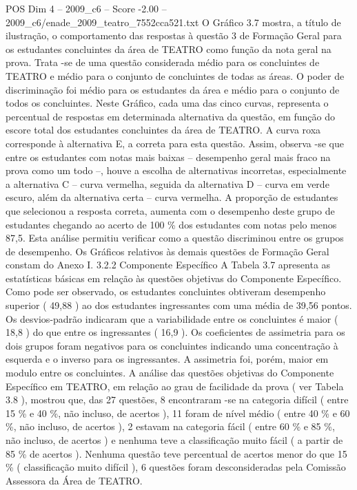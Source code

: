 \begin{textsample}{POS Dim 4 – 2009\_c6 – Score -2.00 – 2009\_c6/enade\_2009\_teatro\_7552cca521.txt}
O Gráfico 3.7 mostra, a título de ilustração, o comportamento das respostas à questão 3 de Formação Geral para os estudantes concluintes da área de TEATRO como função da nota geral na prova.
Trata -se de uma questão considerada médio para os concluintes de TEATRO e médio para o conjunto de concluintes de todas as áreas.
O poder de discriminação foi médio para os estudantes da área e médio para o conjunto de todos os concluintes.
Neste Gráfico, cada uma das cinco curvas, representa o percentual de respostas em determinada alternativa da questão, em função do escore total dos estudantes concluintes da área de TEATRO.
A curva roxa corresponde à alternativa E, a correta para esta questão.
Assim, observa -se que entre os estudantes com notas mais baixas – desempenho geral mais fraco na prova como um todo –, houve a escolha de alternativas incorretas, especialmente a alternativa C – curva vermelha, seguida da alternativa D – curva em verde escuro, além da alternativa certa – curva vermelha.
A proporção de estudantes que selecionou a resposta correta, aumenta com o desempenho deste grupo de estudantes chegando ao acerto de 100 \% dos estudantes com notas pelo menos 87,5.
Esta análise permitiu verificar como a questão discriminou entre os grupos de desempenho.
Os Gráficos relativos às demais questões de Formação Geral constam do Anexo I. 3.2.2 Componente Específico A Tabela 3.7 apresenta as estatísticas básicas em relação às questões objetivas do Componente Específico.
Como pode ser observado, os estudantes concluintes obtiveram desempenho superior ( 49,88 ) ao dos estudantes ingressantes com uma média de 39,56 pontos.
Os desvios-padrão indicaram que a variabilidade entre os concluintes é maior ( 18,8 ) do que entre os ingressantes ( 16,9 ).
Os coeficientes de assimetria para os dois grupos foram negativos para os concluintes indicando uma concentração à esquerda e o inverso para os ingressantes.
A assimetria foi, porém, maior em modulo entre os concluintes.
A análise das questões objetivas do Componente Específico em TEATRO, em relação ao grau de facilidade da prova ( ver Tabela 3.8 ), mostrou que, das 27 questões, 8 encontraram -se na categoria difícil ( entre 15 \% e 40 \%, não incluso, de acertos ), 11 foram de nível médio ( entre 40 \% e 60 \%, não incluso, de acertos ), 2 estavam na categoria fácil ( entre 60 \% e 85 \%, não incluso, de acertos ) e nenhuma teve a classificação muito fácil ( a partir de 85 \% de acertos ).
Nenhuma questão teve percentual de acertos menor do que 15 \% ( classificação muito difícil ), 6 questões foram desconsideradas pela Comissão Assessora da Área de TEATRO.

\end{textsample}
